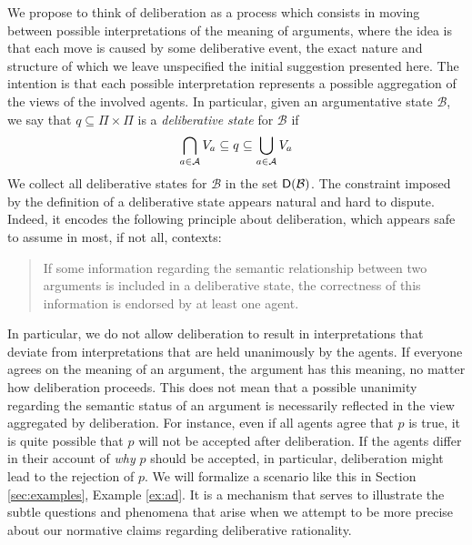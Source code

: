 \documentclass[greybox]{svmult}
\newcommand{\noo}[1]{}
\newcommand{\neu}[2]{#1^n(#2)}
\newcommand{\dstate}[1]{\sf D({#1}) }
\newcommand{\views}{\mathcal B}
\begin{document}
We propose to think of deliberation as a process which consists in moving between possible interpretations of the meaning of arguments, where the idea is that each move is caused by some deliberative event, the exact nature and structure of which we leave unspecified the initial suggestion presented here. The intention is that each possible interpretation represents a possible aggregation of the views of the involved agents. In particular, given an argumentative state $\views$, we say that $q \subseteq \Pi \times \Pi$ is a \emph{deliberative state} for $\views$ if
\begin{equation}\label{eq:ds}
\bigcap_{a \in \agents}V_a \subseteq q \subseteq \bigcup_{a \in \agents}V_a
\end{equation}
We collect all deliberative states for $\views$ in the set $\dstate \views$. \noo{and we use $\Pi(q) = \{x \in \Pi \mid \neu q x \not = \Pi\}$ to denote the set of arguments that appear in some attack from $q$. That is, $\Pi(q)$ contains the arguments that are not neutral with respect to all other arguments, according to the AF $q$.} The constraint imposed by the definition of a deliberative state appears natural and hard to dispute. Indeed, it encodes the following principle about deliberation, which appears safe to assume in most, if not all, contexts:

\begin{quote}\label{principle}
If some information regarding the semantic relationship between two arguments is included in a deliberative state, the correctness of this information is endorsed by at least one agent. 
\end{quote}

In particular, we do not allow deliberation to result in interpretations that deviate from interpretations that are held unanimously by the agents. If everyone agrees on the meaning of an argument, the argument has this meaning, no matter how deliberation proceeds. This does not mean that a possible unanimity regarding the semantic status of an argument is necessarily reflected in the view aggregated by deliberation. For instance, even if all agents agree that $p$ is true, it is quite possible that $p$ will not be accepted after deliberation. If the agents differ in their account of \emph{why} $p$ should be accepted, in particular, deliberation might lead to the rejection of $p$. We will formalize a scenario like this in Section \ref{sec:examples}, Example \ref{ex:ad}. It is a mechanism that serves to illustrate the subtle questions and phenomena that arise when we attempt to be more precise about our normative claims regarding deliberative rationality.
\end{document}
